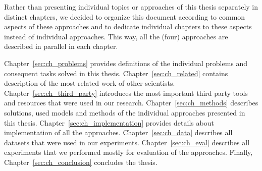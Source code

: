 Rather than presenting individual topics or approaches of this thesis separately in distinct chapters, we decided to organize this document according to common aspects of these approaches and to dedicate individual chapters to these aspects instead of individual approaches. This way, all the (four) approaches are described in parallel in each chapter. 

Chapter~\ref{sec:ch_problems} provides definitions of the individual problems and consequent tasks solved in this thesis.
Chapter~\ref{sec:ch_related} contains description of the most related work of other scientists.
Chapter~\ref{sec:ch_third_party} introduces the most important third party tools and resources that were used in our research.
Chapter~\ref{sec:ch_methods} describes solutions, used models and methods of the individual approaches presented in this thesis.
Chapter~\ref{sec:ch_implementation} provides details about implementation of all the approaches.
Chapter~\ref{sec:ch_data} describes all datasets that were used in our experiments.
Chapter~\ref{sec:ch_eval} describes all experiments that we performed mostly for evaluation of the approaches.
Finally, Chapter~\ref{sec:ch_conclusion} concludes the thesis.

